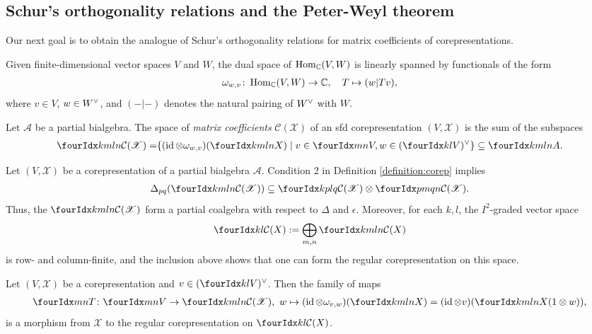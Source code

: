 \subsection{Schur's orthogonality relations and the Peter-Weyl
  theorem}

Our next goal is to obtain the analogue of Schur's orthogonality
relations for matrix coefficients of corepresentations.

Given finite-dimensional vector spaces $V$ and $W$, the dual space of
$\operatorname{Hom}_{\mathbb{C}}(V,W)$ is linearly spanned by functionals of the form
\begin{align*}
  \omega_{w,v} \colon \operatorname{Hom}_{\mathbb{C}}(V,W) \to \mathbb{C}, \quad T \mapsto  (w|Tv),
\end{align*}
where $v\in V$, $w\in W^{\vee}$, and $(-|-)$ denotes the natural
pairing of $W^{\vee}$ with $W$.
\begin{Def} Let $\mathscr{A}$ be a partial bialgebra. The space of
  \emph{matrix coefficients} $\mathcal{C}(\mathscr{X})$ of an sfd
  corepresentation $(V,\mathscr{X})$ is the sum of the subspaces
\begin{align*}
  \Gr{\mathcal{C}(\mathscr{X})}{k}{l}{m}{n} &= \span \left\{ (\id \otimes
    \omega_{w,v})(\Gr{X}{k}{l}{m}{n}) \mid v\in \Gru{V}{m}{n}, w \in
    \dual{(\Gru{V}{k}{l})} \right\} \subseteq \Gr{A}{k}{l}{m}{n}.
\end{align*}
\end{Def}
Let $(V,\mathscr{X})$ be a corepresentation of a partial bialgebra
$\mathscr{A}$.  Condition 2 in Definition \ref{definition:corep}
implies
\begin{align} \label{eq:corep-matrix-delta}
  \Delta_{pq}(\Gr{\mathcal{C}(\mathscr{X})}{k}{l}{m}{n}) \subseteq
  \Gr{\mathcal{C}(\mathscr{X})}{k}{l}{p}{q} \otimes
  \Gr{\mathcal{C}(\mathscr{X})}{p}{q}{m}{n}.
\end{align}
Thus, the $\Gr{\mathcal{C}(\mathscr{X})}{k}{l}{m}{n}$ form a partial
coalgebra with respect to $\Delta$ and $\epsilon$.  Moreover, for each
$k,l$, the $I^{2}$-graded vector  space
\begin{align*}
  \Gru{\mathcal{C}(X)}{k}{l}:=\bigoplus_{m,n }
  \Gr{\mathcal{C}(X)}{k}{l}{m}{n}
\end{align*}
is row- and column-finite, and the inclusion above shows that one can
form the regular corepresentation on this space.
\begin{Lem} \label{lemma:corep-regular-embedding}
  Let $(V,\mathscr{X})$ be a corepresentation and $v\in
  \dual{(\Gru{V}{k}{l})}$. Then the family of maps
  \begin{align*}
    \Gru{T}{m}{n} \colon \Gru{V}{m}{n} \to
    \Gr{\mathcal{C}(\mathscr{X})}{k}{l}{m}{n}, \ w \mapsto (\id
    \otimes \omega_{v,w})(\Gr{X}{k}{l}{m}{n})=(\id \otimes
    v)(\Gr{X}{k}{l}{m}{n}(1 \otimes w)),
  \end{align*}
  is a morphism from $\mathscr{X}$ to the regular corepresentation on
  $\Gru{\mathcal{C}(X)}{k}{l}$.
\end{Lem}

